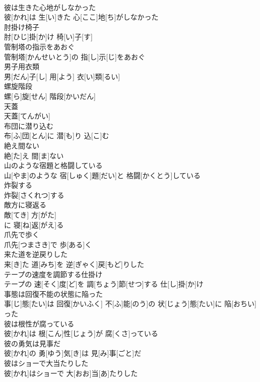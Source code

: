 \documentclass[8pt]{extreport}
\begin{document}
\begin{CJK}{UTF8}{min}
\\	彼は生きた心地がしなかった	
\\	彼[かれ]は 生[い]きた 心[ここ]地[ち]がしなかった
\\	肘掛け椅子	
\\	肘[ひじ]掛[か]け 椅[い]子[す]
\\	管制塔の指示をあおぐ	
\\	管制塔[かんせいとう]の 指[し]示[じ]をあおぐ
\\	男子用衣類	
\\	男[だん]子[し] 用[よう] 衣[い]類[るい]
\\	螺旋階段	
\\	螺[ら]旋[せん] 階段[かいだん]
\\	天蓋	
\\	天蓋[てんがい]
\\	布団に潜り込む	
\\	布[ふ]団[とん]に 潜[も]り 込[こ]む
\\	絶え間ない	
\\	絶[た]え 間[ま]ない
\\	山のような宿題と格闘している	
\\	山[やま]のような 宿[しゅく]題[だい]と 格闘[かくとう]している
\\	炸裂する	
\\	炸裂[さくれつ]する
\\	敵方に寝返る	
\\	敵[てき] 方[がた]
\\	に 寝[ね]返[がえ]る 
\\	爪先で歩く	
\\	爪先[つまさき]で 歩[ある]く
\\	来た道を逆戻りした	
\\	来[き]た 道[みち]を 逆[ぎゃく]戻[もど]りした
\\	テープの速度を調節する仕掛け	
\\	テープの 速[そく]度[ど]を 調[ちょう]節[せつ]する 仕[し]掛[か]け
\\	事態は回復不能の状態に陥った	
\\	事[じ]態[たい]は 回復[かいふく] 不[ふ]能[のう]の 状[じょう]態[たい]に 陥[おちい]った
\\	彼は根性が腐っている	
\\	彼[かれ]は 根[こん]性[じょう]が 腐[くさ]っている
\\	彼の勇気は見事だ	
\\	彼[かれ]の 勇[ゆう]気[き]は 見[み]事[ごと]だ
\\	彼はショーで大当たりした	
\\	彼[かれ]はショーで 大[おお]当[あ]たりした

\end{CJK}
\end{document}
